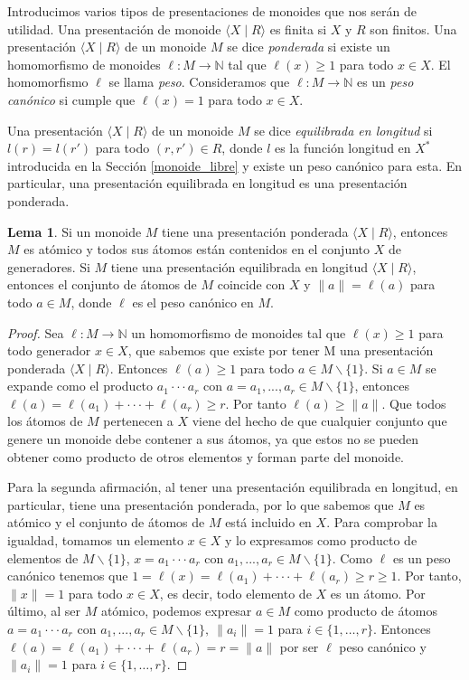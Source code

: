\documentclass[12pt]{book}
\theoremstyle{definition}
\newtheorem{lema}{Lema}[section]
\providecommand{\norm}[1]{\lVert#1\rVert}
\begin{document}
Introducimos varios tipos de presentaciones de monoides que nos serán de utilidad. Una presentación de monoide $\langle X\mid R\rangle$ es finita si $X$ y $R$ son finitos. Una presentación $\langle X\mid R\rangle$ de un monoide $M$ se dice \textit{ponderada} si existe un homomorfismo de monoides $\ell:M\rightarrow \mathbb{N}$ tal que $\ell(x)\geq 1$ para todo $x\in X$. El homomorfismo $\ell$ se llama \textit{peso}. Consideramos que $\ell:M\rightarrow \mathbb{N}$ es un \textit{peso canónico} si cumple que $\ell(x)=1$ para todo $x\in X$.

Una presentación $\langle X\mid R\rangle$ de un monoide $M$ se dice \textit{equilibrada en longitud} si $l(r)=l(r')$ para todo $(r,r')\in R$, donde $l$ es la función longitud en $X^*$ introducida en la Sección \ref{monoide_libre} y existe un peso canónico para esta. En particular, una presentación equilibrada en longitud es una presentación ponderada.

\begin{lema}
Si un monoide $M$ tiene una presentación ponderada $\langle X\mid R\rangle$, entonces $M$ es atómico y todos sus átomos están contenidos en el conjunto $X$ de generadores. Si $M$ tiene una presentación equilibrada en longitud $\langle X\mid R\rangle$, entonces el conjunto de átomos de $M$ coincide con $X$ y $\norm{a}=\ell(a)$ para todo $a\in M$, donde $\ell$ es el peso canónico en $M$.
\label{lema:presen_mono}
\end{lema}

\begin{proof} Sea $\ell: M\rightarrow \mathbb{N}$ un homomorfismo de monoides tal que $\ell(x)\geq 1$ para todo generador $x\in X$, que sabemos que existe por tener M  una presentación ponderada $\langle X\mid R\rangle$. Entonces $\ell(a)\geq 1$ para todo $a\in M \backslash\{1\}$. Si $a\in M$ se expande como el producto $a_1\cdot\cdot\cdot a_r$ con $a = a_1,...,a_r\in M\backslash\{1\}$, entonces $\ell(a)=\ell(a_1)+\cdot\cdot\cdot+\ell(a_r)\geq r$. Por tanto $\ell(a)\geq \norm{a}$. Que todos los átomos de $M$ pertenecen a $X$ viene del hecho de que cualquier conjunto que genere un monoide debe contener a sus átomos, ya que estos no se pueden obtener como producto de otros elementos y forman parte del monoide. 

Para la segunda afirmación, al tener una presentación equilibrada en longitud, en particular, tiene una presentación ponderada, por lo que sabemos que $M$ es atómico y el conjunto de átomos de $M$ está incluido en $X$. Para comprobar la igualdad, tomamos un elemento $x\in X$ y lo expresamos como producto de elementos de $M\backslash\{1\}$, $x = a_1\cdot\cdot\cdot a_r$ con $a_1,...,a_r\in M\backslash\{1\}$. Como $\ell$ es un peso canónico tenemos que $1=\ell(x)=\ell(a_1)+\cdot\cdot\cdot+\ell(a_r)\geq r\geq 1$. Por tanto, $\norm{x}=1$ para todo $x\in X$, es decir, todo elemento de $X$ es un átomo. Por último, al ser $M$ atómico, podemos expresar $a\in M$ como producto de átomos $a =a_1\cdot\cdot\cdot a_r$ con $a_1,...,a_r\in M\backslash\{1\},\ \norm{a_i}=1$  para $i\in\{1,\ldots,r\}$. Entonces $\ell(a)=\ell(a_1)+\cdot\cdot\cdot+\ell(a_r) = r = \norm{a}$ por ser $\ell$ peso canónico y $\norm{a_i}=1$ para $i\in\{1,\ldots,r\}$.
\end{proof}
\end{document}
